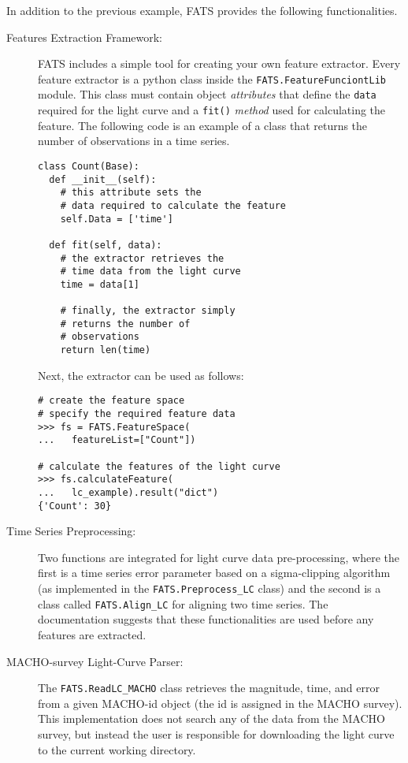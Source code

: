 \documentclass[final,5p,times,twocolumn,authoryear]{elsarticle}
\begin{document}
In addition to the previous example,
FATS provides the following functionalities.
%
\begin{description}
\item [Features Extraction Framework:]
FATS includes a simple tool for creating your own feature extractor.
Every feature extractor is a python class inside the 
\texttt{FATS.FeatureFunciontLib} module. 
%
This class must contain object \textit{attributes} that define the 
\texttt{data} required for the light curve
and a \texttt{fit()} \textit{method} used for calculating the feature.
The following code is an example of a class that returns the number of observations
in a time series.
    
\begin{verbatim}
class Count(Base):
  def __init__(self):
    # this attribute sets the 
    # data required to calculate the feature
    self.Data = ['time']

  def fit(self, data):
    # the extractor retrieves the 
    # time data from the light curve
    time = data[1]  
     
    # finally, the extractor simply 
    # returns the number of 
    # observations
    return len(time)
\end{verbatim}
%
Next, the extractor can be used as follows:
%
\begin{verbatim}
# create the feature space 
# specify the required feature data
>>> fs = FATS.FeatureSpace(
...   featureList=["Count"])
  
# calculate the features of the light curve
>>> fs.calculateFeature(
...   lc_example).result("dict")
{'Count': 30}
\end{verbatim}

\item [Time Series Preprocessing:]
Two functions are integrated for light curve data pre-processing, where 
the first is a time series error parameter based on a sigma-clipping 
algorithm (as implemented in the \texttt{FATS.Preprocess\_LC} class) 
and the second is a class called 
\texttt{FATS.Align\_LC} for aligning two time series.
%
The documentation suggests that these functionalities are used before 
any features are extracted.
%
\item [MACHO-survey Light-Curve Parser:]
The \texttt{FATS.ReadLC\_MACHO} class retrieves the magnitude, time, and error 
from a given MACHO-id object (the id is assigned in the MACHO survey). 
%
This implementation does not search any of the data from the MACHO survey, 
but instead the user is responsible for downloading the light curve to the current 
working directory.
\end{description}
\end{document}
